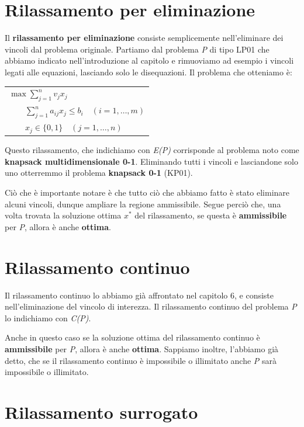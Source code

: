\documentclass[11pt, oneside]{book}
\begin{document}
\section{Rilassamento per eliminazione}

Il {\bf rilassamento per eliminazione} consiste semplicemente
nell'eliminare dei vincoli dal problema originale. Partiamo dal
problema {\em P} di tipo LP01 che abbiamo indicato nell'introduzione
al capitolo e rimuoviamo ad esempio i vincoli legati alle equazioni,
lasciando solo le disequazioni. Il problema che otteniamo \`e:

\begin{center}
\begin{tabular}{l}
$\max \sum\limits_{j=1}^n v_j x_j $\\
$\qquad \sum\limits_{j=1}^{n} a_{ij} x_j \leq b_i \quad (i=1,\dots,m)$
  \\
$\qquad x_j \in \{0,1\} \quad (j=1,\dots,n)$
\end{tabular}
\end{center}

Questo rilassamento, che indichiamo con {\em E(P)} corrisponde al
problema noto come {\bf knapsack multidimensionale 0-1}. Eliminando
tutti i vincoli e lasciandone solo uno otterremmo il problema {\bf
  knapsack 0-1} (KP01).

Ci\`o che \`e importante notare \`e che tutto ci\`o che abbiamo fatto
\`e stato eliminare alcuni vincoli, dunque ampliare la regione
ammissibile. Segue perci\`o che, una volta trovata la soluzione
ottima $x^*$ del rilassamento, se questa \`e {\bf ammissibile} per
{\em P}, allora \`e anche {\bf ottima}.

\section{Rilassamento continuo}

Il rilassamento continuo lo abbiamo gi\`a affrontato nel capitolo 6, e
consiste nell'eliminazione del vincolo di interezza. Il rilassamento
continuo del problema {\em P} lo indichiamo con {\em C(P)}.

Anche in questo caso se la soluzione ottima del rilassamento continuo
\`e {\bf ammissibile} per {\em P}, allora \`e anche {\bf
  ottima}. Sappiamo inoltre, l'abbiamo gi\`a detto, che se il
rilassamento continuo \`e impossibile o illimitato anche {\em P}
sar\`a impossibile o illimitato.

\section{Rilassamento surrogato}
\end{document}
